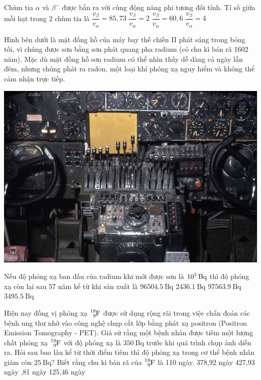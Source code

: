 \begin{ex}
	Chùm tia $\alpha$ và $\beta^-$ được bắn ra với cùng động năng phi tương đối tính. Tỉ số giữa mỗi hạt trong 2 chùm tia là
	\choice
	{\True $\dfrac{v_\beta}{v_\alpha}=85,73$}
	{$\dfrac{v_\beta}{v_\alpha}=2$}
	{$\dfrac{v_\beta}{v_\alpha}=60,6$}
	{$\dfrac{v_\beta}{v_\alpha}=4$}
\end{ex}
\begin{ex}
	Hình bên dưới là mặt đồng hồ của máy bay thế chiến II phát sáng trong bóng tối, vì chúng được sơn bằng sơn phát quang pha radium (có chu kì bán rã 1602 năm). Mặc dù mặt đồng hồ sơn radium có thể nhìn thấy dễ dàng cả ngày lẫn đêm, nhưng chúng phát ra radon, một loại khí phóng xạ nguy hiểm và không thể cảm nhận trực tiếp. 
	\begin{center}
		\includegraphics[width=0.4\linewidth]{figs/VN12-Y24-PH-SYL-032P-1}
	\end{center}
	Nếu độ phóng xạ ban đầu của radium khi mới được sơn là $\SI{E5}{\becquerel}$ thì độ phóng xạ còn lại sau 57 năm kể từ khi sản xuất là
	\choice
	{$\SI{96504.5}{\becquerel}$}
	{$\SI{2436.1}{\becquerel}$}
	{\True $\SI{97563.9}{\becquerel}$}
	{$\SI{3495.5}{\becquerel}$}
\end{ex}
\begin{ex}
	Hiện nay đồng vị phóng xạ $\ce{_9^{18}F}$ được sử dụng rộng rãi trong việc chẩn đoán các bệnh ung thư nhờ vào công nghệ chụp cắt lớp bằng phát xạ positron (Positron Emission Tomography - PET). Giả sử rằng một bệnh nhân được tiêm một lượng chất phóng xạ $\ce{_9^{18}F}$ với độ phóng xạ là $\SI{350}{\becquerel}$ trước khi quá trình chụp ảnh diễn ra. Hỏi sau bao lâu kể từ thời điểm tiêm thì độ phóng xạ trong cơ thể bệnh nhân giảm còn $\SI{25}{\becquerel}$? Biết rằng chu kì bán rã của $\ce{_9^{18}F}$ là 110 ngày.
	\choice
	{378,92 ngày}
	{427,93 ngày}
	{,81 ngày}
	{125,46 ngày}
\end{ex}
